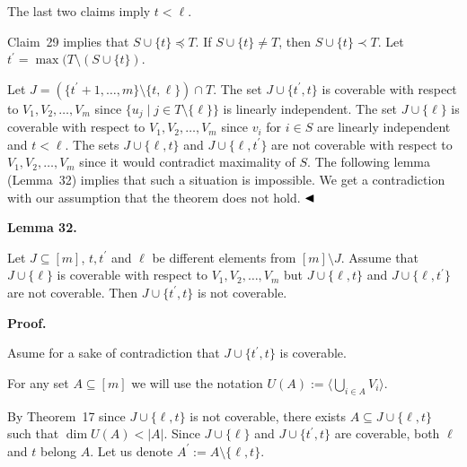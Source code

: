 The last two claims imply $t<\ell$.\par



Claim 29 implies that $S\cup\{t\}\preceq T$. If $S\cup\{t\}\neq T$, then $S\cup\{t\}\prec T$.
Let $t^{\prime}=\max(T\setminus(S\cup\{t\})$.\par



Let $J=(\{t^{\prime}+1,\dots,m\}\setminus\{t,\ell\})\cap T$.
The set $J\cup\{t^{\prime},t\}$ is coverable with respect to $V_{1},V_{2},\dots,V_{m}$ since $\{u_{j}\mid j\in T\setminus\{\ell\}\}$ is linearly independent.
The set $J\cup\{\ell\}$ is coverable with respect to $V_{1},V_{2},\dots,V_{m}$ since $v_{i}$ for $i\in S$ are linearly independent and $t<\ell$.
The sets $J\cup\{\ell,t\}$ and $J\cup\{\ell,t^{\prime}\}$ are not coverable with respect to $V_{1},V_{2},\dots,V_{m}$ since it would contradict maximality of $S$. The following lemma (Lemma 32) implies that such a situation is impossible. We get a contradiction with our assumption that the theorem does not hold.
$\hfill\blacktriangleleft$\par



\par\medskip\noindent\textbf{
Lemma 32.
}\par



Let $J\subseteq[m]$, $t,t^{\prime}$ and $\ell$ be different elements from $[m]\setminus J$.
Assume that $J\cup\{\ell\}$ is coverable with respect to $V_{1},V_{2},\dots,V_{m}$ but $J\cup\{\ell,t\}$ and $J\cup\{\ell,t^{\prime}\}$ are not coverable. Then $J\cup\{t^{\prime},t\}$ is not coverable.\par



\par\medskip\noindent\textbf{Proof.}\par


Asume for a sake of contradiction that $J\cup\{t^{\prime},t\}$ is coverable.\par



For any set $A\subseteq[m]$ we will use the notation $U(A):=\langle\bigcup_{i\in A}V_{i}\rangle$.\par



By Theorem 17 since $J\cup\{\ell,t\}$ is not coverable, there exists $A\subseteq J\cup\{\ell,t\}$ such that $\dim U(A)<|A|$.
Since $J\cup\{\ell\}$ and $J\cup\{t^{\prime},t\}$ are coverable, both $\ell$ and $t$ belong $A$.
Let us denote $A^{\prime}:=A\setminus\{\ell,t\}$.\par



